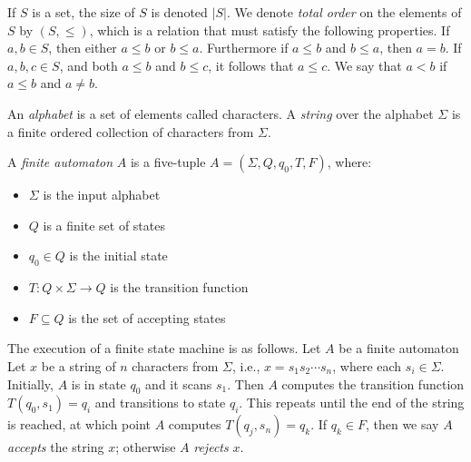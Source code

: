 \documentclass[12pt,letterpaper,oneside]{book}
\begin{document}



If $S$ is a set, the size of $S$ is denoted $|S|$.  We denote \emph{total order} on the elements of $S$ by $(S,\le)$, which is a 
relation that must satisfy the following properties.  
If $a,b\in S$, then either $a\le b$ or $b\le a$.  Furthermore if $a\le b$ and $b\le a$, then $a=b$.  If $a,b,c\in S$, and both 
$a\le b$ and $b\le c$, it follows that $a\le c$.  We say that $a<b$ if $a\le b$ and $a\ne b$.  

 

An \emph{alphabet} is a set of elements called characters.  A \emph{string} over the 
alphabet $\Sigma$ is a finite ordered collection of characters from $\Sigma$.  


\noindent A \emph{finite automaton} $A$ is a 
five-tuple $A = (\Sigma,Q,q_0,T,F)$, where:
\begin{itemize}
\item $\Sigma$ is the input alphabet
\item $Q$ is a finite set of states
\item $q_0\in Q$ is the initial state 
\item $T : Q \times \Sigma \to Q$ is the transition function
\item $F \subseteq Q$ is the set of accepting states
\end{itemize}  

The execution of a finite state machine is as follows. 
Let $A$ be a finite automaton  Let $x$ be a string of $n$ characters from $\Sigma$, i.e., 
$x=s_1 s_2 \cdots s_n$, where each $s_i \in \Sigma$.  Initially, $A$ is in 
state $q_0$ and it scans $s_1$.  
Then $A$ computes the transition function $T(q_0,s_1)=q_i$ and transitions to state $q_i$.  
This repeats until the end of the string is reached, at which point $A$ computes $T(q_j,s_n)=q_k$.    
If $q_k \in F$, 
then we say $A$ \emph{accepts} the string $x$; otherwise $A$ \emph{rejects} $x$.  
\end{document}
